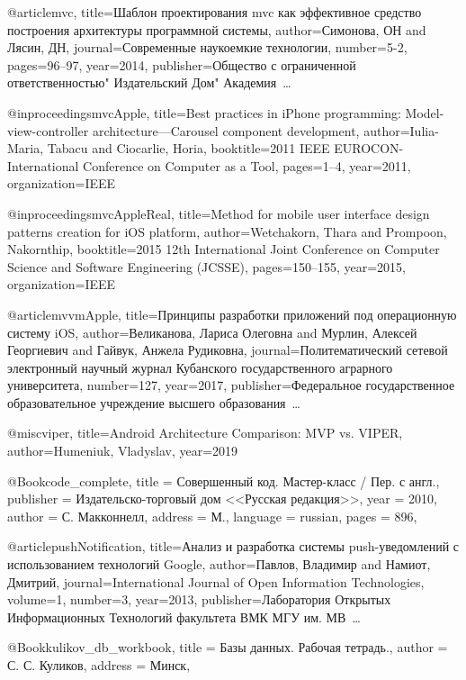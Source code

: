 @article{mvc,
  title={Шаблон проектирования mvc как эффективное средство построения архитектуры программной системы},
  author={Симонова, ОН and Лясин, ДН},
  journal={Современные наукоемкие технологии},
  number={5-2},
  pages={96--97},
  year={2014},
  publisher={Общество с ограниченной ответственностью" Издательский Дом" Академия~…}
}

@inproceedings{mvcApple,
  title={Best practices in iPhone programming: Model-view-controller architecture—Carousel component development},
  author={Iulia-Maria, Tabacu and Ciocarlie, Horia},
  booktitle={2011 IEEE EUROCON-International Conference on Computer as a Tool},
  pages={1--4},
  year={2011},
  organization={IEEE}
}

@inproceedings{mvcAppleReal,
  title={Method for mobile user interface design patterns creation for iOS platform},
  author={Wetchakorn, Thara and Prompoon, Nakornthip},
  booktitle={2015 12th International Joint Conference on Computer Science and Software Engineering (JCSSE)},
  pages={150--155},
  year={2015},
  organization={IEEE}
}

@article{mvvmApple,
  title={Принципы разработки приложений под операционную систему iOS},
  author={Великанова, Лариса Олеговна and Мурлин, Алексей Георгиевич and Гайвук, Анжела Рудиковна},
  journal={Политематический сетевой электронный научный журнал Кубанского государственного аграрного университета},
  number={127},
  year={2017},
  publisher={Федеральное государственное образовательное учреждение высшего образования~…}
}

@misc{viper,
  title={Android Architecture Comparison: MVP vs. VIPER},
  author={Humeniuk, Vladyslav},
  year={2019}
}

@Book{code_complete,
  title     = {Совершенный код. Мастер-класс / Пер. с англ.},
  publisher = {Издательско-торговый дом <<Русская редакция>>},
  year      = {2010},
  author    = {С. Макконнелл},
  address   = {М.},
  language  = {russian},
  pages     = {896},
}


@article{pushNotification,
  title={Анализ и разработка системы push-уведомлений с использованием технологий Google},
  author={Павлов, Владимир and Намиот, Дмитрий},
  journal={International Journal of Open Information Technologies},
  volume={1},
  number={3},
  year={2013},
  publisher={Лаборатория Открытых Информационных Технологий факультета ВМК МГУ им. МВ~…}
}

@Book{kulikov_db_workbook,
  title   = {Базы данных. Рабочая тетрадь.},
  author  = {С. С. Куликов},
  address = {Минск},
}


